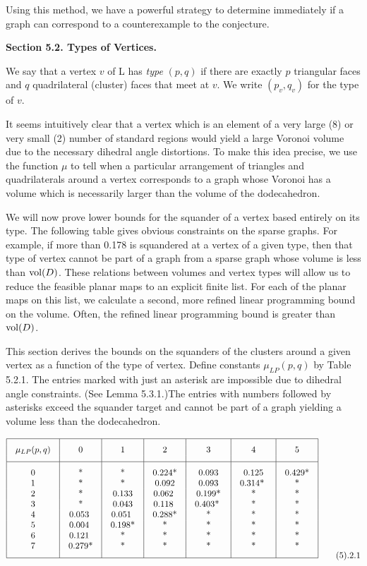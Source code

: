 Using this method, we have a powerful strategy to determine immediately if a graph 
can correspond to a counterexample to the conjecture.  

\bigskip

{\bf Section 5.2. Types of Vertices.}

\bigskip 

We say that a vertex $v$ of L has {\it type} $(p,q)$ if there are exactly $p$ triangular faces and $q$ quadrilateral (cluster) faces that meet at $v$.  We write $(p_v,q_v)$ for the type of $v$.  


It seems intuitively clear that a vertex which is an element of a very large 
(8) or very small (2) number of standard regions would yield a large Voronoi volume due to the necessary dihedral angle distortions.  To make this idea precise, we use the function $\mu$ to tell when a particular arrangement of triangles and quadrilaterals around a vertex corresponds to a graph whose Voronoi has a volume which is necessarily larger than the volume of the dodecahedron.  

We will now prove lower bounds for the squander of a vertex based entirely on its type.  The following table gives obvious constraints on the sparse graphs.  For example, if more than 0.178 is squandered at a vertex of a given type, then that type of vertex cannot be part of a graph from a sparse graph whose volume is less than $\operatorname{vol}(D)$.  These relations between volumes and vertex types will allow us to reduce the feasible planar maps to an explicit finite list.  For each of the planar maps on this list, we calculate a second, more refined linear programming bound on the volume.  Often, the refined linear programming bound is greater than $\operatorname{vol}(D)$.  

This section derives the bounds on the squanders of the clusters around a given vertex as a function of the type of vertex.  Define constants $\mu_{LP} (p,q)$ by Table 5.2.1.  The entries marked with just an asterisk are impossible due to dihedral angle constraints.  
(See Lemma 5.3.1.)The entries with numbers followed by asterisks exceed  the squander target and cannot be part of a graph yielding a volume less than the dodecahedron.


$$
\vbox{\offinterlineskip
\hrule
\halign{&\vrule#&\strut\quad\hfil#\hfil\quad\cr
height 7pt&\omit&&\omit&&\omit&&\omit&&\omit&&\omit&&\omit&\cr
&\hfil $\mu_{LP} (p,q)$\hfil
        &&\hfil0\hfil
        &&\hfil1\hfil
        &&\hfil2\hfil
        &&\hfil3\hfil
        &&\hfil4\hfil
        &&\hfil5\hfil&
\cr
height 7pt&\omit&&\omit&&\omit&&\omit&&\omit&&\omit&&\omit&\cr
\noalign{\hrule}
height7pt&\omit&&\omit&&\omit&&\omit&&\omit&&\omit&&\omit&\cr
&0&&	*&&	*&&	0.224*&&  0.093&& 0.125&& 0.429*&\cr
&1&&	*&& *&&  0.092&& 0.093&& 0.314* && *&\cr
&2&&	*&& 0.133&& 0.062 && 0.199*&& *&&*&\cr
&3&&	*&& 0.043&& 0.118 && 0.403* &&*&&*&\cr
&4&& 0.053 && 0.051 && 0.288*&&*&&*&&*&\cr
&5&& 0.004 && 0.198*&&*&&*&&*&&*&\cr
&6&& 0.121 &&*&&*&&*&&*&&*&\cr
&7&& 0.279*&&*&&*&&*&&*&&*&\cr
height7pt&\omit&&\omit&&\omit&&\omit&&\omit&&\omit&&\omit&\cr}
\hrule
}\tag 5.2.1
$$


